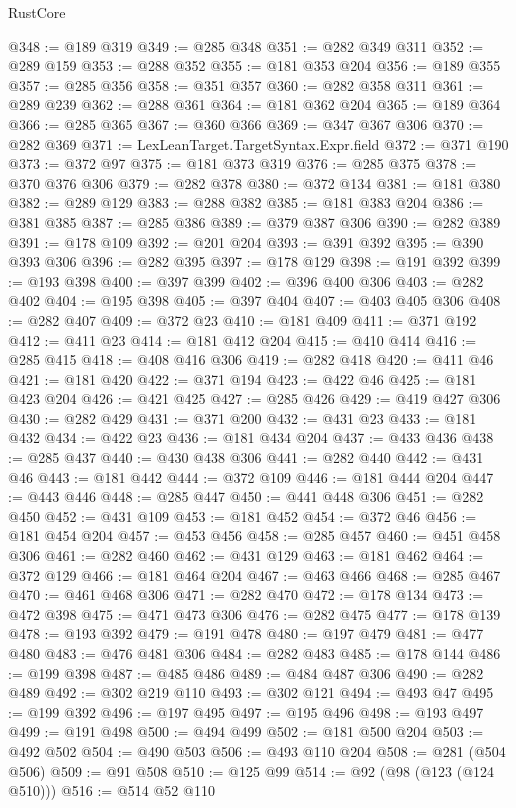 \begin{lexlean}{RustCore}
\begin{coremodule}
@348 := @189 @319
@349 := @285 @348
@351 := @282 @349 @311
@352 := @289 @159
@353 := @288 @352
@355 := @181 @353 @204
@356 := @189 @355
@357 := @285 @356
@358 := @351 @357
@360 := @282 @358 @311
@361 := @289 @239
@362 := @288 @361
@364 := @181 @362 @204
@365 := @189 @364
@366 := @285 @365
@367 := @360 @366
@369 := @347 @367 @306
@370 := @282 @369
@371 := LexLeanTarget.TargetSyntax.Expr.field
@372 := @371 @190
@373 := @372 @97
@375 := @181 @373 @319
@376 := @285 @375
@378 := @370 @376 @306
@379 := @282 @378
@380 := @372 @134
@381 := @181 @380
@382 := @289 @129
@383 := @288 @382
@385 := @181 @383 @204
@386 := @381 @385
@387 := @285 @386
@389 := @379 @387 @306
@390 := @282 @389
@391 := @178 @109
@392 := @201 @204
@393 := @391 @392
@395 := @390 @393 @306
@396 := @282 @395
@397 := @178 @129
@398 := @191 @392
@399 := @193 @398
@400 := @397 @399
@402 := @396 @400 @306
@403 := @282 @402
@404 := @195 @398
@405 := @397 @404
@407 := @403 @405 @306
@408 := @282 @407
@409 := @372 @23
@410 := @181 @409
@411 := @371 @192
@412 := @411 @23
@414 := @181 @412 @204
@415 := @410 @414
@416 := @285 @415
@418 := @408 @416 @306
@419 := @282 @418
@420 := @411 @46
@421 := @181 @420
@422 := @371 @194
@423 := @422 @46
@425 := @181 @423 @204
@426 := @421 @425
@427 := @285 @426
@429 := @419 @427 @306
@430 := @282 @429
@431 := @371 @200
@432 := @431 @23
@433 := @181 @432
@434 := @422 @23
@436 := @181 @434 @204
@437 := @433 @436
@438 := @285 @437
@440 := @430 @438 @306
@441 := @282 @440
@442 := @431 @46
@443 := @181 @442
@444 := @372 @109
@446 := @181 @444 @204
@447 := @443 @446
@448 := @285 @447
@450 := @441 @448 @306
@451 := @282 @450
@452 := @431 @109
@453 := @181 @452
@454 := @372 @46
@456 := @181 @454 @204
@457 := @453 @456
@458 := @285 @457
@460 := @451 @458 @306
@461 := @282 @460
@462 := @431 @129
@463 := @181 @462
@464 := @372 @129
@466 := @181 @464 @204
@467 := @463 @466
@468 := @285 @467
@470 := @461 @468 @306
@471 := @282 @470
@472 := @178 @134
@473 := @472 @398
@475 := @471 @473 @306
@476 := @282 @475
@477 := @178 @139
@478 := @193 @392
@479 := @191 @478
@480 := @197 @479
@481 := @477 @480
@483 := @476 @481 @306
@484 := @282 @483
@485 := @178 @144
@486 := @199 @398
@487 := @485 @486
@489 := @484 @487 @306
@490 := @282 @489
@492 := @302 @219 @110
@493 := @302 @121
@494 := @493 @47
@495 := @199 @392
@496 := @197 @495
@497 := @195 @496
@498 := @193 @497
@499 := @191 @498
@500 := @494 @499
@502 := @181 @500 @204
@503 := @492 @502
@504 := @490 @503
@506 := @493 @110 @204
@508 := @281 (@504 @506)
@509 := @91 @508
@510 := @125 @99
@514 := @92 (@98 (@123 (@124 @510)))
@516 := @514 @52 @110

\end{coremodule}
\end{lexlean}
